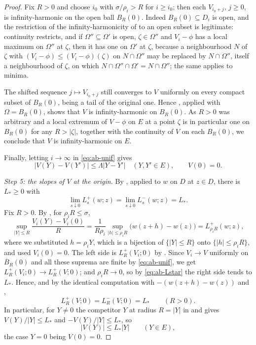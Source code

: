 \begin{proof}
Fix $R>0$ and choose $i_0$ with $\sigma/\rho_i>R$ for $i\ge i_0$; then each
$V_{i_0+j}$, $j\ge0$, is infinity-harmonic on the open ball $B_R(0)$. Indeed
$B_R(0)\subseteq D_i$ is open, and the restriction of the infinity-harmonicity
of  to an open subset is legitimate: continuity
restricts, and if $\Omega''\subseteq\Omega'$ is open, $\zeta\in\Omega''$ and
$V_i-\phi$ has a local maximum on $\Omega''$ at $\zeta$, then it has one on
$\Omega'$ at $\zeta$, because a neighbourhood $N$ of $\zeta$ with
$(V_i-\phi)\le(V_i-\phi)(\zeta)$ on $N\cap\Omega''$ may be replaced by
$N\cap\Omega''$, itself a neighbourhood of $\zeta$, on which
$N\cap\Omega''\cap\Omega'=N\cap\Omega''$; the same applies to minima.

The shifted sequence $j\mapsto V_{i_0+j}$ still converges to $V$ uniformly on
every compact subset of $B_R(0)$, being a tail of the original one. Hence
, applied with $\Omega=B_R(0)$, shows that $V$ is
infinity-harmonic on $B_R(0)$. As $R>0$ was arbitrary and a local extremum of
$V-\phi$ on $E$ at a point $\zeta$ is in particular one on $B_R(0)$ for any
$R>|\zeta|$, together with the continuity of $V$ on each $B_R(0)$, we conclude
that $V$ is infinity-harmonic on $E$.

Finally, letting $i\to\infty$ in \eqref{eq:ab-unif} gives
\begin{equation}\label{eq:ab-Vlip}
  |V(Y)-V(Y')|\le\Lambda|Y-Y'|\quad(Y,Y'\in E),\qquad V(0)=0 .
\end{equation}

\emph{Step 5: the slopes of $V$ at the origin.}
By , applied to $w$ on $D$ at $z\in D$, there is
$L_*\ge0$ with
\begin{equation}\label{eq:ab-Lstar}
  \lim_{s\downarrow0}L_s^+(w;z)=\lim_{s\downarrow0}L_s^-(w;z)=L_* .
\end{equation}
Fix $R>0$. By , for $\rho_iR\le\sigma$,
\[
  \sup_{|Y|\le R}\frac{V_i(Y)-V_i(0)}{R}
   =\frac{1}{R\rho_i}\sup_{|h|\le\rho_iR}\bigl(w(z+h)-w(z)\bigr)
   =L_{\rho_iR}^+(w;z),
\]
where we substituted $h=\rho_iY$, which is a bijection of $\{|Y|\le R\}$ onto
$\{|h|\le\rho_iR\}$, and used $V_i(0)=0$. The left side is
$L_R^+(V_i;0)$ by . Since $V_i\to V$ uniformly on
$\overline B_R(0)$ and all these suprema are finite by \eqref{eq:ab-unif}, we
get $L_R^+(V_i;0)\to L_R^+(V;0)$; and $\rho_iR\to0$, so by
\eqref{eq:ab-Lstar} the right side tends to $L_*$. Hence, and by the identical
computation with $-(w(z+h)-w(z))$ and ,
\begin{equation}\label{eq:ab-origin}
  L_R^+(V;0)=L_R^-(V;0)=L_*\qquad(R>0).
\end{equation}
In particular, for $Y\ne0$ the competitor $Y$ at radius $R=|Y|$ in
 and  gives
$V(Y)/|Y|\le L_*$ and $-V(Y)/|Y|\le L_*$, so
\begin{equation}\label{eq:ab-cone}
  |V(Y)|\le L_*|Y|\qquad(Y\in E),
\end{equation}
the case $Y=0$ being $V(0)=0$.


\end{proof}

